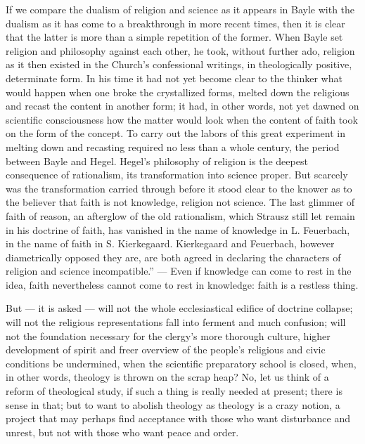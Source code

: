 \documentclass[12pt]{book}
\newcommand{\opage}[1]{\marginnote{\footnotesize\textit{[#1]}}}
\begin{document}
If we compare the dualism of religion and science as it appears in Bayle with
the dualism as it has come to a breakthrough in more recent times, then it is
clear that the latter is more than a simple repetition of the former. When
Bayle set religion and philosophy against each other, he took, without further
ado,
\opage{273}\setcounter{footnote}{0}%
religion as it then existed in the Church's confessional writings, in
theologically positive, determinate form. In his time it had not yet become
clear to the thinker what would happen when one broke the crystallized forms,
melted down the religious and recast the content in another form; it had, in
other words, not yet dawned on scientific consciousness how the matter would
look when the content of faith took on the form of the concept. To carry out
the labors of this great experiment in melting down and recasting required no
less than a whole century, the period between Bayle and Hegel. Hegel's
philosophy of religion is the deepest consequence of rationalism, its
transformation into science proper. But scarcely was the transformation
carried through before it stood clear to the knower as to the believer that
faith is not knowledge, religion not science. The last glimmer of faith of
reason, an afterglow of the old rationalism, which Strausz still let remain in
his doctrine of faith, has vanished in the name of knowledge in
L. Feuerbach, in the name of faith in S. Kierkegaard. Kierkegaard and
Feuerbach, however diametrically opposed they are, are both agreed in
declaring the characters of religion and science incompatible.'' --- Even if
knowledge can come to rest in the idea, faith nevertheless cannot come to rest
in knowledge: faith is a restless thing.

But --- it is asked --- will not the whole ecclesiastical edifice of doctrine
collapse; will not the religious representations fall into ferment and much
confusion; will not the foundation necessary for the clergy's more thorough
culture, higher development of spirit and freer overview of the people's
religious and civic conditions be undermined, when the scientific preparatory
school is closed, when, in other words, theology is thrown on the scrap heap?
No, let us think of a reform of theological study,
\opage{274}\setcounter{footnote}{0}%
if such a thing is really needed at present; there is sense in that; but to
want to abolish theology as theology is a crazy notion, a project that may
perhaps find acceptance with those who want disturbance and unrest, but not
with those who want peace and order.
\end{document}
